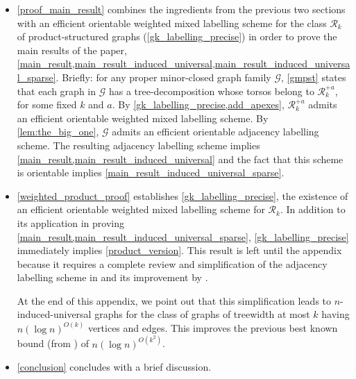 \documentclass{patmorin}
\newcommand{\Oh}{O}
\newcommand{\calG}{\mathcal{G}}
\newcommand{\calR}{\mathcal{R}}
\begin{document}
\begin{itemize}
\item \cref{proof_main_result} combines the ingredients from the previous two sections with an efficient orientable weighted mixed labelling scheme for the class $\calR_k$ of product-structured graphs (\cref{gk_labelling_precise}) in order to prove the main results of the paper, \cref{main_result,main_result_induced_universal,main_result_induced_universal_sparse}.  Briefly: for any proper minor-closed graph family $\calG$, \cref{gmpst} states that each graph in $\calG$ has a tree-decomposition whose torsos belong to $\calR_k^{+a}$, for some fixed $k$ and $a$.  By \cref{gk_labelling_precise,add_apexes}, $\calR_k^{+a}$ admits an efficient orientable weighted mixed labelling scheme.  By \cref{lem:the_big_one}, $\calG$ admits an efficient orientable adjacency labelling scheme.  The resulting adjacency labelling scheme implies \cref{main_result,main_result_induced_universal} and the fact that this scheme is orientable implies \cref{main_result_induced_universal_sparse}.

\item \cref{weighted_product_proof} establishes \cref{gk_labelling_precise}, the existence of an efficient orientable weighted mixed labelling scheme for $\calR_k$.  In addition to its application in proving \cref{main_result,main_result_induced_universal_sparse}, \cref{gk_labelling_precise} immediately implies \cref{product_version}. This result is left until the appendix because it requires a complete review and simplification of the adjacency labelling scheme in \citet{dujmovic.esperet.ea:adjacency} and its improvement by \citet{gawrychowski.janczewski:simpler}.

At the end of this appendix, we point out that this simplification leads to $n$-induced-universal graphs for the class of graphs of treewidth at most $k$ having $n(\log n)^{\Oh(k)}$ vertices and edges.  This improves the previous best known bound (from \cite{EJM23}) of $n(\log n)^{\Oh(k^2)}$.

\item \cref{conclusion} concludes with a brief discussion.
\end{itemize}
\end{document}
